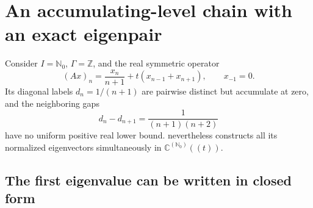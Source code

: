 \documentclass[11pt,a4paper]{article}
\numberwithin{equation}{section}
\theoremstyle{definition}
\theoremstyle{remark}
\newcommand{\C}{\mathbb C}
\newcommand{\N}{\mathbb N}
\newcommand{\Z}{\mathbb Z}
\begin{document}
\section{An accumulating-level chain with an exact eigenpair}\label{ihs:sec:chain}

Consider $I=\N_0$, $\Gamma=\Z$, and the real symmetric operator
\begin{equation}\label{ihs:rf:eq:chain}
 (Ax)_n=\frac{x_n}{n+1}+t(x_{n-1}+x_{n+1}),\qquad x_{-1}=0.
\end{equation}
Its diagonal labels $d_n=1/(n+1)$ are pairwise distinct but accumulate at
zero, and the neighboring gaps
\[
 d_n-d_{n+1}=\frac1{(n+1)(n+2)}
\]
have no uniform positive real lower bound. 
nevertheless constructs all its normalized eigenvectors simultaneously in
$\C^{(\N_0)}((t))$.

\subsection{The first eigenvalue can be written in closed form}\label{ihs:rf:sec:closed}
\end{document}
